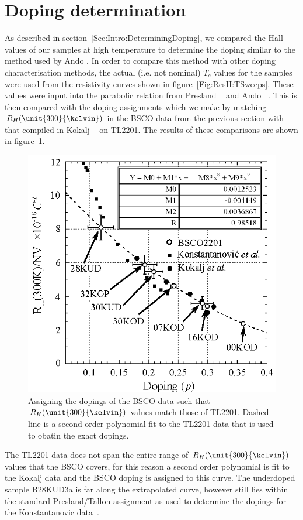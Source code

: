 
\section{Doping determination}
    \label{Sec:ResH:DopingDetermination}

As described in section~\ref{Sec:Intro:DeterminingDoping}, we compared the Hall values of our samples at high temperature to determine the doping similar to the method used by Ando \etal\cite{Ando2000}. In order to compare this method with other doping characterisation methods, the actual (i.e. not nominal) $T_c$ values for the samples were used from the resistivity curves shown in figure~\ref{Fig:ResH:TSweeps}. These values were input into the parabolic relation from Presland \etal~\cite{Presland1991} and Ando \etal~\cite{Ando2000}. This is then compared with the doping assignments which we make by matching $R_H(\unit{300}{\kelvin})$ in the \ac{BSCO} data from the previous section with that compiled in Kokalj \etal~\cite{Kokalj2012} on \ac{TL2201}. The results of these comparisons are shown in figure~\ref{Fig:ResH:DopingRh300}.
\begin{figure}[htbp]
    \begin{center}
        \includegraphics[scale=0.9]{Chapter-HallBSCO/Figures/DopingRh300/DopingRh300}
        \caption{Assigning the dopings of the \ac{BSCO} data such that $R_H(\unit{300}{\kelvin})$ values match those of \ac{TL2201}. Dashed line is a second order polynomial fit to the \ac{TL2201} data that is used to obatin the exact dopings.}
        \label{Fig:ResH:DopingRh300}
    \end{center}
\end{figure}
The \ac{TL2201} data does not span the entire range of $R_H(\unit{300}{\kelvin})$ values that the \ac{BSCO} covers, for this reason a second order polynomial is fit to the Kokalj data and the \ac{BSCO} doping is assigned to this curve. The underdoped sample B28KUD3a is far along the extrapolated curve, however still lies within the standard Presland/Tallon assignment as used to determine the dopings for the Konstantanovic data~\cite{Konstantinovic2001}.

